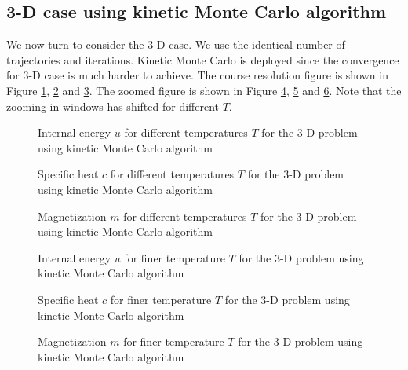 \documentclass[english, nochinese]{pnote}
\begin{document}
\subsection{3-D case using kinetic Monte Carlo algorithm}

We now turn to consider the 3-D case. We use the identical number of trajectories and iterations. Kinetic Monte Carlo is deployed since the convergence for 3-D case is much harder to achieve. The course resolution figure is shown in Figure \ref{Fig:HeatSmall3D}, \ref{Fig:CapSmall3D} and \ref{Fig:MagSmall3D}. The zoomed figure is shown in Figure \ref{Fig:HeatBig3D}, \ref{Fig:CapBig3D} and \ref{Fig:MagBig3D}. Note that the zooming in windows has shifted for different $T$.

\begin{figure}[htbp]
\centering
\scalebox{0.666}{}
\caption{Internal energy $u$ for different temperatures $T$ for the 3-D problem using kinetic Monte Carlo algorithm}
\label{Fig:HeatSmall3D}
\end{figure}

\begin{figure}[htbp]
\centering
\scalebox{0.666}{}
\caption{Specific heat $c$ for different temperatures $T$ for the 3-D problem using kinetic Monte Carlo algorithm}
\label{Fig:CapSmall3D}
\end{figure}

\begin{figure}[htbp]
\centering
\scalebox{0.666}{}
\caption{Magnetization $m$ for different temperatures $T$ for the 3-D problem using kinetic Monte Carlo algorithm}
\label{Fig:MagSmall3D}
\end{figure}

\begin{figure}[htbp]
\centering
\scalebox{0.666}{}
\caption{Internal energy $u$ for finer temperature $T$ for the 3-D problem using kinetic Monte Carlo algorithm}
\label{Fig:HeatBig3D}
\end{figure}

\begin{figure}[htbp]
\centering
\scalebox{0.666}{}
\caption{Specific heat $c$ for finer temperature $T$ for the 3-D problem using kinetic Monte Carlo algorithm}
\label{Fig:CapBig3D}
\end{figure}

\begin{figure}[htbp]
\centering
\scalebox{0.666}{}
\caption{Magnetization $m$ for finer temperature $T$ for the 3-D problem using kinetic Monte Carlo algorithm}
\label{Fig:MagBig3D}
\end{figure}
\end{document}
